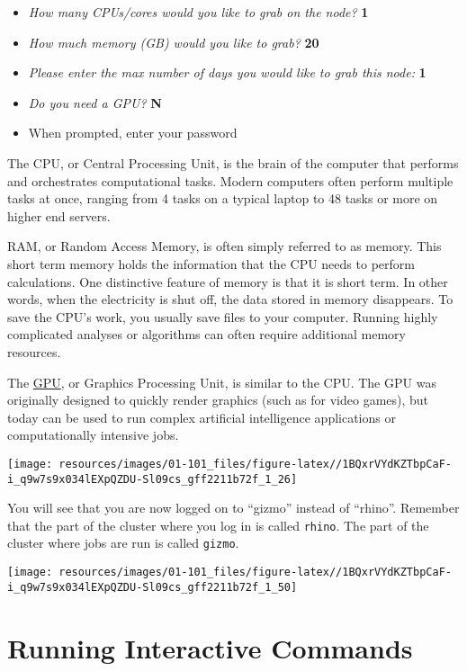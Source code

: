 \documentclass[
]{book}
\providecommand{\tightlist}{%
  \setlength{\itemsep}{0pt}\setlength{\parskip}{0pt}}
\begin{document}
\begin{itemize}
\tightlist
\item
  \emph{How many CPUs/cores would you like to grab on the node?} \textbf{1}
\item
  \emph{How much memory (GB) would you like to grab?} \textbf{20}
\item
  \emph{Please enter the max number of days you would like to grab this node:} \textbf{1}
\item
  \emph{Do you need a GPU?} \textbf{N}
\item
  When prompted, enter your password
\end{itemize}

The CPU, or Central Processing Unit, is the brain of the computer that performs and orchestrates computational tasks. Modern computers often perform multiple tasks at once, ranging from 4 tasks on a typical laptop to 48 tasks or more on higher end servers.

RAM, or Random Access Memory, is often simply referred to as memory. This short term memory holds the information that the CPU needs to perform calculations. One distinctive feature of memory is that it is short term. In other words, when the electricity is shut off, the data stored in memory disappears. To save the CPU's work, you usually save files to your computer. Running highly complicated analyses or algorithms can often require additional memory resources.

The \href{https://www.intel.com/content/www/us/en/products/docs/processors/what-is-a-gpu.html}{GPU}, or Graphics Processing Unit, is similar to the CPU. The GPU was originally designed to quickly render graphics (such as for video games), but today can be used to run complex artificial intelligence applications or computationally intensive jobs.

\texttt{[image: resources/images/01-101\_files/figure-latex//1BQxrVYdKZTbpCaF-i\_q9w7s9x034lEXpQZDU-Sl09cs\_gff2211b72f\_1\_26]}

You will see that you are now logged on to ``gizmo'' instead of ``rhino''. Remember that the part of the cluster where you log in is called \texttt{rhino}. The part of the cluster where jobs are run is called \texttt{gizmo}.

\texttt{[image: resources/images/01-101\_files/figure-latex//1BQxrVYdKZTbpCaF-i\_q9w7s9x034lEXpQZDU-Sl09cs\_gff2211b72f\_1\_50]}

\hypertarget{running-interactive-commands}{%
\section{Running Interactive Commands}\label{running-interactive-commands}}
\end{document}
